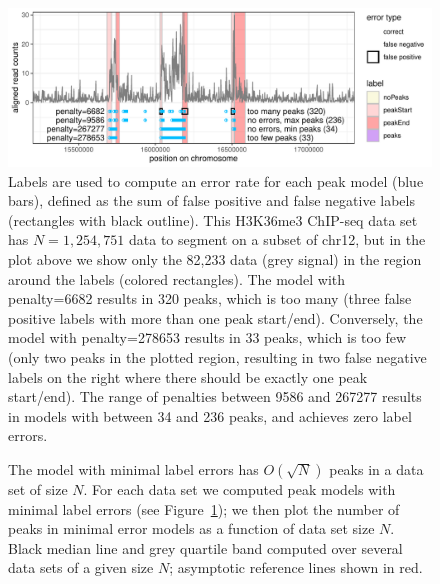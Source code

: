 \documentclass[article]{jss}
\begin{document}
\begin{figure}[t!]
\centering
\includegraphics{jss-figure-label-error}
\caption{\label{fig:label-error} Labels are used to compute an error
  rate for each peak model (blue bars), defined as the sum of false
  positive and false negative labels (rectangles with black
  outline). This H3K36me3 ChIP-seq data set has $N=1,254,751$ data to
  segment on a subset of chr12, but in the plot above we show only the
  82,233 data (grey signal) in the region around the labels (colored
  rectangles). The model with penalty=6682 results in 320 peaks, which
  is too many (three false positive labels with more than one peak
  start/end). Conversely, the model with penalty=278653 results in 33
  peaks, which is too few (only two peaks in the plotted region,
  resulting in two false negative labels on the right where there
  should be exactly one peak start/end). The range of penalties between 9586 and
  267277 results in models with between 34 and 236 peaks, and achieves
  zero label errors. }
\end{figure}

\begin{figure}[t!]
\centering

\caption{\label{fig:data-peaks} The model with minimal label
  errors has $O(\sqrt{N})$ peaks in a data set of size $N$. For each data set we
  computed peak models with minimal label errors (see
  Figure~\ref{fig:label-error}); we then plot the number of peaks in
  minimal error models as a function of data set size $N$. Black median line
  and grey quartile band computed over several data sets of a given size
  $N$; asymptotic reference lines shown in red.}
\end{figure}
  
\end{document}
